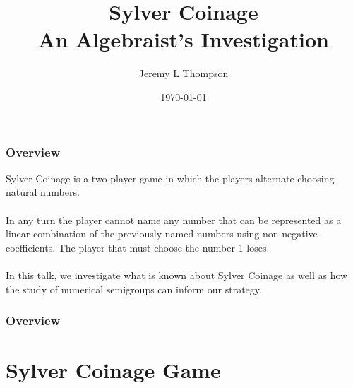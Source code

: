 \documentclass{beamer}
\title[Sylver Coinage]{Sylver Coinage\\An Algebraist's Investigation} %
\author{Jeremy L Thompson} %
\institute[USAFA] %
{United States Air Force Academy \\ %
\medskip
\textit{jeremy.thompson@usafa.edu} %
}
\date{\today} %
\begin{document}
\begin{frame}
\titlepage %
\end{frame}


\begin{frame}
\begin{center}
\frametitle{Overview}

Sylver Coinage is a two-player game in which the players alternate choosing natural numbers.\\

~\\

In any turn the player cannot name any number that can be represented as a linear combination of the previously named numbers using non-negative coefficients. The player that must choose the number 1 loses.\\

~\\

In this talk, we investigate what is known about Sylver Coinage as well as how the study of numerical semigroups can inform our strategy.

\end{center}
\end{frame}
 

\begin{frame}
\frametitle{Overview} %
\tableofcontents %
\end{frame}


\section{Sylver Coinage Game}
\end{document}
